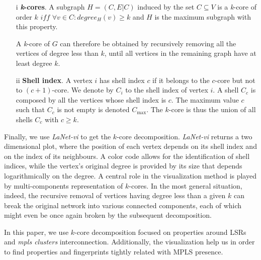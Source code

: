 \begin{itemize}
\item[i]{\textbf{\textit{k}-cores}}. A subgraph $H=(C,E|C)$ induced by the set $ C\subseteq V$ is a \textit{k}-core of order $k$ $iff$ $\forall v \in C: degree_{H}(v)\geq k$ and $H$ is the maximum subgraph with this property.

A \textit{k}-core of $G$ can therefore be obtained by recursively removing all the vertices of degree less than $k$, until all vertices in the remaining graph have at least degree $k$. 

\item[ii]\textbf{Shell index}. A vertex $i$ has shell index $c$ if it belongs to the $c$-core but not to $(c+1)$-core. We denote by $C_i$ to the shell index of vertex $i$. A shell $C_c$ is composed by all the vertices whose shell index is $c$. The maximum value $c$ such that $C_c$ is not empty is denoted $C_{\max}$. The $k$-core is thus the union of all shells $C_c$ with $c \geq k$.

\end{itemize}

Finally, we use  \textit{LaNet-vi} \cite{Alvarez06k} to get the $k$-core decomposition. \textit{LaNet-vi} returns a two dimensional plot, where the position of each vertex depends on its shell index and on the index of its neighbours. A color code allows for the identification of shell indices, while the vertex's original degree is provided by its size that depends logarithmically on the degree. A central role in the visualization method is played by multi-components representation of $k$-cores. In the most general situation, indeed, the recursive removal of vertices having degree less than a given $k$ can break the original network into various connected components, each of which might even be once again broken by the subsequent decomposition.

In this paper, we use $k$-core decomposition focused on properties around LSRs and \textit{mpls clusters} interconnection. Additionally,  the visualization help us in order to find properties and fingerprints tightly related with MPLS presence.

